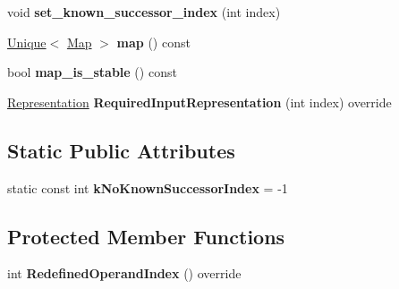 \begin{DoxyCompactItemize}
\item 
void {\bfseries set\+\_\+known\+\_\+successor\+\_\+index} (int index)\hypertarget{classv8_1_1internal_1_1_h_compare_map_aae8aa057f467c18fff5c0707818c5a5f}{}\label{classv8_1_1internal_1_1_h_compare_map_aae8aa057f467c18fff5c0707818c5a5f}

\item 
\hyperlink{classv8_1_1internal_1_1_unique}{Unique}$<$ \hyperlink{classv8_1_1internal_1_1_map}{Map} $>$ {\bfseries map} () const \hypertarget{classv8_1_1internal_1_1_h_compare_map_a2fe914300e57af4a1f8b26e31af4c81c}{}\label{classv8_1_1internal_1_1_h_compare_map_a2fe914300e57af4a1f8b26e31af4c81c}

\item 
bool {\bfseries map\+\_\+is\+\_\+stable} () const \hypertarget{classv8_1_1internal_1_1_h_compare_map_a6920419a08ed9e8e392b980cf006a62a}{}\label{classv8_1_1internal_1_1_h_compare_map_a6920419a08ed9e8e392b980cf006a62a}

\item 
\hyperlink{classv8_1_1internal_1_1_representation}{Representation} {\bfseries Required\+Input\+Representation} (int index) override\hypertarget{classv8_1_1internal_1_1_h_compare_map_a07ef3c42a70d044372621f143541266e}{}\label{classv8_1_1internal_1_1_h_compare_map_a07ef3c42a70d044372621f143541266e}

\end{DoxyCompactItemize}
\subsection*{Static Public Attributes}
\begin{DoxyCompactItemize}
\item 
static const int {\bfseries k\+No\+Known\+Successor\+Index} = -\/1\hypertarget{classv8_1_1internal_1_1_h_compare_map_adbec6ca3abd9a55fa520b254654f8744}{}\label{classv8_1_1internal_1_1_h_compare_map_adbec6ca3abd9a55fa520b254654f8744}

\end{DoxyCompactItemize}
\subsection*{Protected Member Functions}
\begin{DoxyCompactItemize}
\item 
int {\bfseries Redefined\+Operand\+Index} () override\hypertarget{classv8_1_1internal_1_1_h_compare_map_af0cde665c89af7be8e454896fb32b60c}{}\label{classv8_1_1internal_1_1_h_compare_map_af0cde665c89af7be8e454896fb32b60c}

\end{DoxyCompactItemize}
